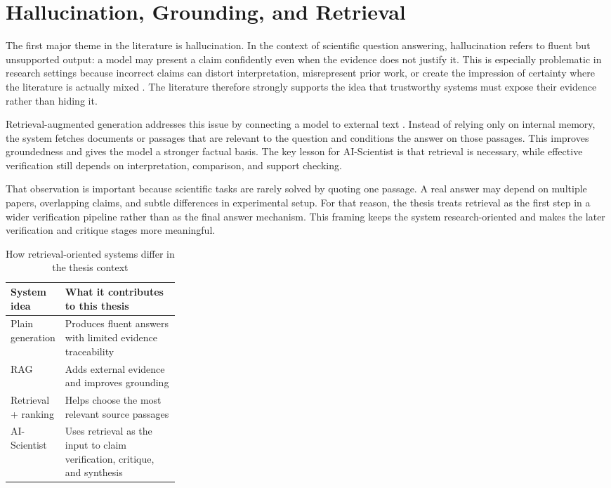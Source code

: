 \section{Hallucination, Grounding, and Retrieval}

The first major theme in the literature is hallucination. In the context of scientific question answering, hallucination refers to fluent but unsupported output: a model may present a claim confidently even when the evidence does not justify it. This is especially problematic in research settings because incorrect claims can distort interpretation, misrepresent prior work, or create the impression of certainty where the literature is actually mixed \cite{manakul2023selfcheckgpt,min2023factscore,ji2023hallucination}. The literature therefore strongly supports the idea that trustworthy systems must expose their evidence rather than hiding it.

Retrieval-augmented generation addresses this issue by connecting a model to external text \cite{lewis2020rag,guu2020realm}. Instead of relying only on internal memory, the system fetches documents or passages that are relevant to the question and conditions the answer on those passages. This improves groundedness and gives the model a stronger factual basis. The key lesson for AI-Scientist is that retrieval is necessary, while effective verification still depends on interpretation, comparison, and support checking.

That observation is important because scientific tasks are rarely solved by quoting one passage. A real answer may depend on multiple papers, overlapping claims, and subtle differences in experimental setup. For that reason, the thesis treats retrieval as the first step in a wider verification pipeline rather than as the final answer mechanism. This framing keeps the system research-oriented and makes the later verification and critique stages more meaningful.

\begin{table}[H]
\centering
\begin{tabularx}{\linewidth}{>{\raggedright\arraybackslash}p{0.28\linewidth} >{\raggedright\arraybackslash}X}
\toprule
System idea & What it contributes to this thesis \\
\midrule
Plain generation & Produces fluent answers with limited evidence traceability \\
RAG & Adds external evidence and improves grounding \\
Retrieval + ranking & Helps choose the most relevant source passages \\
AI-Scientist & Uses retrieval as the input to claim verification, critique, and synthesis \\
\bottomrule
\end{tabularx}
\caption{How retrieval-oriented systems differ in the thesis context}
\end{table}

